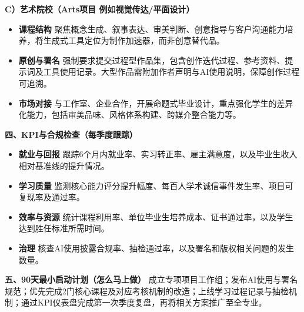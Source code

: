 \documentclass{mcmthesis}
\begin{document}
\begin{memo}
\noindent\textbf{C）艺术院校（Arts项目 例如视觉传达/平面设计）}
\begin{itemize}\setlength\itemsep{2pt}
\item \textbf{课程结构} 聚焦概念生成、叙事表达、审美判断、创意指导与客户沟通能力培养，将生成式工具定位为制作加速器，而非创意替代品。
\item \textbf{原创与署名} 强制要求提交过程型作品集，包含创作迭代过程、参考资料、提示词及工具使用记录。大型作品需附加作者声明与AI使用说明，保障创作过程可追溯。
\item \textbf{市场对接} 与工作室、企业合作，开展命题式毕业设计，重点强化学生的差异化能力，包括审美品味、风格体系构建、跨媒介整合能力等。
\end{itemize}

\vspace{4pt}
\noindent\textbf{四、KPI与合规检查（每季度跟踪）}
\begin{itemize}\setlength\itemsep{2pt}
\item \textbf{就业与回报} 跟踪6个月内就业率、实习转正率、雇主满意度，以及毕业生收入相对基准线的提升情况。
\item \textbf{学习质量} 监测核心能力评分提升幅度、每百人学术诚信事件发生率、项目可复现率及通过率。
\item \textbf{效率与资源} 统计课程利用率、单位毕业生培养成本、证书通过率，以及学生达到胜任标准所需时间。
\item \textbf{治理} 核查AI使用披露合规率、抽检通过率，以及署名和版权相关问题的发生数量。
\end{itemize}

\vspace{4pt}
\noindent\textbf{五、90天最小启动计划（怎么马上做）}
成立专项项目工作组；发布AI使用与署名规范；优先完成2门核心课程及对应考核机制的改造；上线学习过程记录与抽检机制；通过KPI仪表盘完成第一次季度复盘，再将相关方案推广至全专业。
 
\end{memo}
\end{document}
